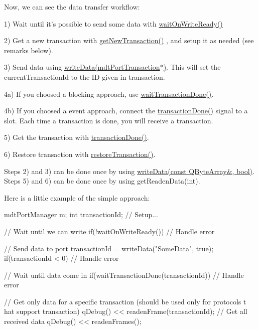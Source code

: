 Now, we can see the data transfer workflow:
\begin{DoxyItemize}
\item 1) Wait until it's possible to send some data with \hyperlink{classmdt_port_manager_a1ca92c5ac120d87e5b10bff54ed1aa5c}{waitOnWriteReady()}
\item 2) Get a new transaction with \hyperlink{classmdt_port_manager_a75ebd3d1859e3ed38b9558981e53aac4}{getNewTransaction()} , and setup it as needed (see remarks below).
\item 3) Send data using \hyperlink{classmdt_port_manager_a328abc7f5f2677c19ea11567df6597da}{writeData(mdtPortTransaction$\ast$)}. This will set the currentTransactionId to the ID given in transaction.
\item 4a) If you choosed a blocking approach, use \hyperlink{classmdt_port_manager_a5551802de2c08632078f2cc0e2607913}{waitTransactionDone()}.
\item 4b) If you choosed a event approach, connect the \hyperlink{classmdt_port_manager_a5869bcf6774a86fb9d3b00a0d4211bb5}{transactionDone()} signal to a slot. Each time a transaction is done, you will receive a transaction.
\item 5) Get the transaction with \hyperlink{classmdt_port_manager_a5869bcf6774a86fb9d3b00a0d4211bb5}{transactionDone()}.
\item 6) Restore transaction with \hyperlink{classmdt_port_manager_a5fea4a9b8e94d38e8ec699dba05c7ca8}{restoreTransaction()}.
\end{DoxyItemize}

Steps 2) and 3) can be done once by using \hyperlink{classmdt_port_manager_a9b902a60c8b21585904bcb1d6e604369}{writeData(const QByteArray\&, bool)}. Steps 5) and 6) can be done once by using getReadenData(int).

Here is a little example of the simple approach: 
\begin{DoxyCode}
 mdtPortManager m;
 int transactionId;
 // Setup...

 // Wait until we can write
 if(!waitOnWriteReady()){
   // Handle error
 }

 // Send data to port
 transactionId = writeData("SomeData", true);
 if(transactionId < 0){
   // Handle error
 }

 // Wait until data come in
 if(waitTransactionDone(transactionId)){
   // Handle error
 }

 // Get only data for a specific transaction (should be used only for protocols t
      hat support transaction)
 qDebug() << readenFrame(transactionId);
 // Get all received data
 qDebug() << readenFrames();
\end{DoxyCode}


